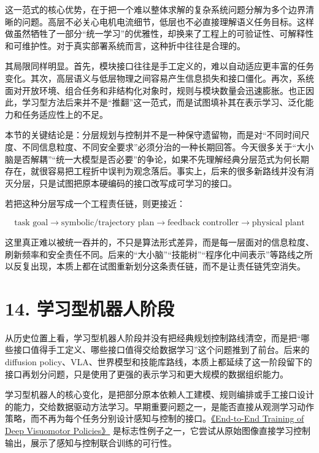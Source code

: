 这一范式的核心优势，在于把一个难以整体求解的复杂系统问题分解为多个边界清晰的问题。高层不必关心电机电流细节，低层也不必直接理解语义任务目标。这样做虽然牺牲了一部分“统一学习”的优雅性，却换来了工程上的可验证性、可解释性和可维护性。对于真实部署系统而言，这种折中往往是合理的。

其局限同样明显。首先，模块接口往往是手工定义的，难以自动适应更丰富的任务变化。其次，高层语义与低层物理之间容易产生信息损失和接口僵化。再次，系统面对开放环境、组合任务和非结构化对象时，规则与模块数量会迅速膨胀。也正因此，学习型方法后来并不是“推翻”这一范式，而是试图填补其在表示学习、泛化能力和任务适应性上的不足。

本节的关键结论是：分层规划与控制并不是一种保守遗留物，而是对“不同时间尺度、不同信息粒度、不同安全要求”必须分治的一种长期回答。今天很多关于“大小脑是否解耦”“统一大模型是否必要”的争论，如果不先理解经典分层范式为何长期存在，就很容易把工程折中误判为观念落后。事实上，后来的很多新路线并没有消灭分层，只是试图把原本硬编码的接口改写成可学习的接口。

若把这种分层写成一个工程责任链，则更接近：

\begingroup
\scriptsize
\begin{equation*}
\text{task goal} \rightarrow \text{symbolic/trajectory plan} \rightarrow \text{feedback controller} \rightarrow \text{physical plant}
\end{equation*}
\endgroup

这里真正难以被统一吞并的，不只是算法形式差异，而是每一层面对的信息粒度、刷新频率和安全责任不同。后来的“大小脑”“技能树”“程序化中间表示”等路线之所以反复出现，本质上都在试图重新划分这条责任链，而不是让责任链凭空消失。

\chapter*{14. 学习型机器人阶段}

从历史位置上看，学习型机器人阶段并没有把经典规划控制路线清空，而是把“哪些接口值得手工定义、哪些接口值得交给数据学习”这个问题推到了前台。后来的 diffusion policy、VLA、世界模型和技能库路线，本质上都延续了这一阶段留下的接口再划分问题，只是使用了更强的表示学习和更大规模的数据组织能力。

学习型机器人的核心变化，是把部分原本依赖人工建模、规则编排或手工接口设计的能力，交给数据驱动方法学习。早期重要问题之一，是能否直接从观测学习动作策略，而不再为每个任务分别设计感知与控制的接口。\href{https://arxiv.org/abs/1504.00702}{《End-to-End Training of Deep Visuomotor Policies》} 是标志性例子之一，它尝试从原始图像直接学习控制输出，展示了感知与控制联合训练的可行性。

